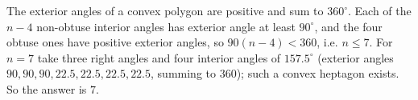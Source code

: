 The exterior angles of a convex polygon are positive and sum to $360^\circ$. Each of the $n-4$ non-obtuse interior angles has exterior angle at least $90^\circ$, and the four obtuse ones have positive exterior angles, so $90(n-4)<360$, i.e. $n\le7$. For $n=7$ take three right angles and four interior angles of $157.5^\circ$ (exterior angles $90,90,90,22.5,22.5,22.5,22.5$, summing to $360$); such a convex heptagon exists. So the answer is $\boxed{7}$.
